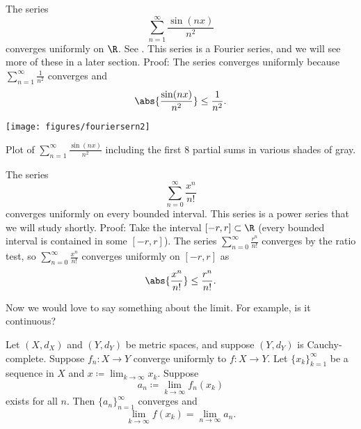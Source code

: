 \begin{example} \label{example:sinnsqfourier}
The series
\begin{equation*}
\sum_{n=1}^\infty \frac{\sin(nx)}{n^2}
\end{equation*}
converges uniformly on $\R$.  See .
This series is a Fourier series, and
we will see more of these in a later section.  Proof:
The series converges uniformly because
$\sum_{n=1}^\infty \frac{1}{n^2}$
converges and
\begin{equation*}
\abs{\frac{\sin(nx)}{n^2}} \leq 
\frac{1}{n^2} .
\end{equation*}
\end{example}

\begin{myfigureht}
\texttt{[image: figures/fouriersern2]}
\caption{Plot of 
$\sum_{n=1}^\infty \frac{\sin(n x)}{n^2}$ including
the first 8 partial sums in various shades of gray.\label{fig:fouriersern2}}
\end{myfigureht}

\begin{example}
The series
\begin{equation*}
\sum_{n=0}^\infty \frac{x^n}{n!} 
\end{equation*}
converges uniformly on every bounded interval.
This series is a power series that we will study shortly.
Proof: Take the interval $[-r,r] \subset \R$ (every bounded interval
is contained in some $[-r,r]$).
The series $\sum_{n=0}^\infty \frac{r^n}{n!}$ converges by the ratio test,
so $\sum_{n=0}^\infty \frac{x^n}{n!}$ converges uniformly on $[-r,r]$ as
\begin{equation*}
\abs{\frac{x^n}{n!} } \leq 
\frac{r^n}{n!} .
\end{equation*}
\end{example}

Now we would love to say something about the limit.  For example, is it
continuous?


\begin{prop} \label{prop:uniformswitch}
Let $(X,d_X)$ and $(Y,d_Y)$ be metric spaces, and suppose $(Y,d_Y)$ is
Cauchy-complete.
Suppose $f_n \colon X \to Y$ converge uniformly to
 $f \colon X \to Y$.  
Let $\{ x_k \}_{k=1}^\infty$ be a sequence in $X$ and $x \coloneqq \lim_{k \to \infty} x_k$.  Suppose
\begin{equation*}
a_n \coloneqq \lim_{k \to \infty} f_n(x_k)
\end{equation*}
exists for all $n$.  Then
$\{a_n\}_{n=1}^\infty$ converges and 
\begin{equation*}
\lim_{k \to \infty} f(x_k) = \lim_{n\to\infty} a_n .
\end{equation*}
\end{prop}

